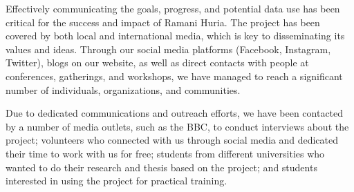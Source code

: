 \documentclass[a4paper,12pt,twoside]{article}
\begin{document}
Effectively communicating the goals, progress, and potential data use has been critical for the success and impact of Ramani Huria. The project has been covered by both local and international media, which is key to disseminating its values and ideas. Through our social media platforms (Facebook, Instagram, Twitter), blogs on our website, as well as direct contacts with people at conferences, gatherings, and workshops, we have managed to reach a significant number of individuals, organizations, and communities. 

Due to dedicated communications and outreach efforts, we have been contacted by a number of media outlets, such as the BBC, to conduct interviews about the project; volunteers who connected with us through social media and dedicated their time to work with us for free; students from different universities who wanted to do their research and thesis based on the project; and students interested in using the project for practical training.



\end{document}
